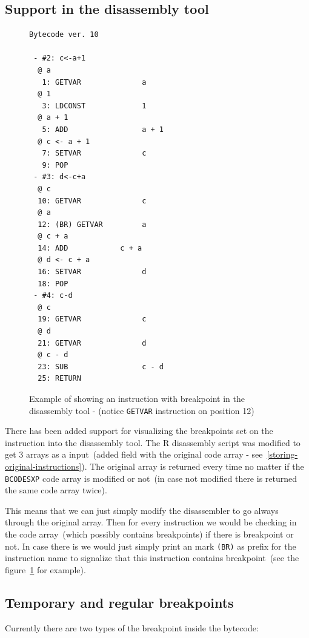 \documentclass[thesis=M,english]{FITthesis}[2018/10/20]
\newcommand{\code}[1]{\texttt{#1}}
\begin{document}
\subsection{Support in the disassembly tool}\label{debugger-support-in-disassembly}

\begin{figure}[h]
\begin{lstlisting}
Bytecode ver. 10

 - #2: c<-a+1
  @ a
   1: GETVAR              a
  @ 1
   3: LDCONST             1
  @ a + 1
   5: ADD                 a + 1
  @ c <- a + 1
   7: SETVAR              c
   9: POP
 - #3: d<-c+a
  @ c
  10: GETVAR              c
  @ a
  12: (BR) GETVAR         a
  @ c + a
  14: ADD            c + a
  @ d <- c + a
  16: SETVAR              d
  18: POP
 - #4: c-d
  @ c
  19: GETVAR              c
  @ d
  21: GETVAR              d
  @ c - d
  23: SUB                 c - d
  25: RETURN
\end{lstlisting}
	\caption{Example of showing an instruction with breakpoint in the disassembly tool - (notice \code{GETVAR} instruction on position 12)}\label{fig:breakpoints-in-disassembly-example}
\end{figure}

There has been added support for visualizing the breakpoints set on the instruction into the disassembly tool. The R disassembly script was modified to get 3 arrays as a input~(added field with the original code array - see~\ref{storing-original-instructions}). The original array is returned every time no matter if the \code{BCODESXP} code array is modified or not~(in case not modified there is returned the same code array twice).

This means that we can just simply modify the disassembler to go always through the original array. Then for every instruction we would be checking in the code array~(which possibly contains breakpoints) if there is breakpoint or not. In case there is we would just simply print an mark \code{(BR)} as prefix for the instruction name to signalize that this instruction contains breakpoint~(see the figure~\ref{fig:breakpoints-in-disassembly-example} for example).

\subsection{Temporary and regular breakpoints}\label{temporary-and-regular-breakpoints}

Currently there are two types of the breakpoint inside the bytecode:
\end{document}
